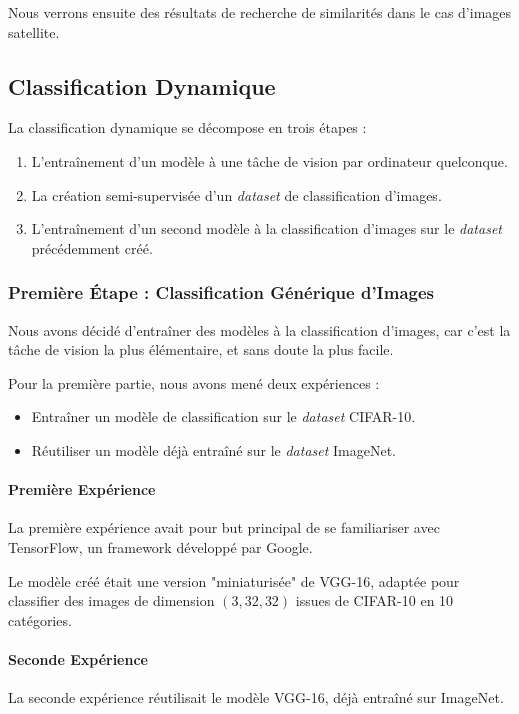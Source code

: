 \documentclass[a4paper, 11pt]{report}
\begin{document}
Nous verrons ensuite des résultats de recherche de similarités dans le cas d'images satellite.

\subsection{Classification Dynamique}
La classification dynamique se décompose en trois étapes :
\begin{enumerate}
	\item L'entraînement d'un modèle à une tâche de vision par ordinateur quelconque.
	\item La création semi-supervisée d'un \emph{dataset} de classification d'images.
	\item L'entraînement d'un second modèle à la classification d'images sur le \emph{dataset} précédemment créé.
\end{enumerate}

\subsubsection{Première Étape : Classification Générique d'Images}
Nous avons décidé d'entraîner des modèles à la classification d'images, car c'est la tâche de vision la plus élémentaire, et sans doute la plus facile.

Pour la première partie, nous avons mené deux expériences :
\begin{itemize}
	\item Entraîner un modèle de classification sur le \emph{dataset} CIFAR-10.
	\item Réutiliser un modèle déjà entraîné sur le \emph{dataset} ImageNet.
\end{itemize}

\paragraph{Première Expérience}
La première expérience avait pour but principal de se familiariser avec TensorFlow, un framework développé par Google.

Le modèle créé était une version "miniaturisée" de VGG-16, adaptée pour classifier des images de dimension $(3, 32, 32)$ issues de CIFAR-10 en 10 catégories.

\paragraph{Seconde Expérience}
La seconde expérience réutilisait le modèle VGG-16, déjà entraîné sur ImageNet.
\end{document}
